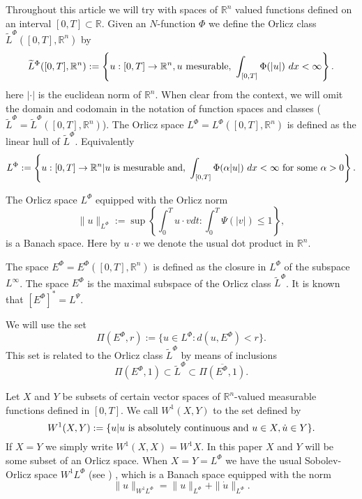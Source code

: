 \documentclass[twoside]{article}
\newcommand{\orlnor}{\|_{L^{\Phi}}}
\newcommand{\lurnor}{\|^{*}_{L^{\Phi}}}
\newcommand{\lphi}{L^{\Phi}}
\newcommand{\lpsi}{L^{\Psi}}
\newcommand{\ephi}{E^{\Phi}}
\newcommand{\claseor}{\widetilde{L}^{\Phi}}
\newcommand{\wphi}{W^{1}\lphi}
\begin{document}
Throughout this article we will try with spaces of $\mathbb{R}^n$ valued functions defined on an interval $[0,T]\subset\mathbb{R}$. Given an $N$-function $\Phi$ we
define the Orlicz class $\widetilde{L}^{\Phi}([0,T],\mathbb{R}^n)$ by
\begin{equation}\label{claseOrlicz}
  \widetilde{L}^{\Phi}([0,T],\mathbb{R}^n):=\left\{ u: [0,T] \rightarrow\mathbb{R}^n, u\ \hbox{mesurable},\ \int_{[0,T]} \Phi(|u|)\ dx < \infty \right\}.
\end{equation}
here $|\cdot|$ is the euclidean norm of $\mathbb{R}^n$. When clear from the context, we will omit the domain and codomain in the notation of function spaces and
classes ($\claseor=\widetilde{L}^{\Phi}([0,T],\mathbb{R}^n)$). The Orlicz space $\lphi=L^{\Phi}([0,T],\mathbb{R}^n)$ is defined as the linear hull of $\claseor$.
Equivalently
\begin{equation}\label{espacioOrlicz}
\lphi:=\left\{ u: [0,T] \rightarrow \mathbb{R}^n | u\ \hbox{is mesurable and},\ \int_{[0,T]} \Phi(\alpha|u|)\ dx < \infty \ \hbox{for some}\ \alpha >0   \right\}.
\end{equation}



The Orlicz space $\lphi$ equipped with the Orlicz norm
\[
\|  u  \orlnor:=\sup \left\{  \int_0^Tu\cdot vdt: \int_0^T\Psi(|v|)\leq 1\right\},
\]
is a Banach space. Here by $u \cdot v$ we denote the usual dot product in $\mathbb{R}^{n}$.




The space $\ephi=\ephi([0,T],\mathbb{R}^n)$ is defined as the closure in $\lphi$ of the subspace $L^{\infty}$. The space $\ephi$ is the maximal subspace of the
Orlicz class $\claseor$. It is known that $\left[\ephi\right]^*=\lpsi$.


We will use the set
\[\Pi(\ephi,r):=\{u\in\lphi: d(u,\ephi)<r\}.\]
This set is related to the Orlicz class $\claseor$ by means of inclusions
\[\Pi(\ephi,1)\subset \claseor \subset\overline{\Pi(\ephi,1)}.\]

Let $X$ and $Y$ be subsets of certain vector spaces of $\mathbb{R}^n$-valued measurable functions defined in $[0,T]$.   We call $W^1(X,Y)$ to the set defined by
\[W^1(X,Y):=\{u| u \hbox{ is absolutely continuous and } u\in X, \dot{u}\in Y\}.\]
If $X=Y$ we simply write $W^1(X,X)=W^1X$. In this paper $X$ and $Y$ will be some subset of an Orlicz space.  When $X=Y=\lphi$ we have the usual Sobolev-Orlicz space
 $\wphi$ (see \cite{adams_sobolev}) , which is a Banach space  equipped with the norm
\[
\|  u  \|_{\wphi}= \|  u  \|_{\lphi} + \|\dot{u}\orlnor.
\]
\end{document}

